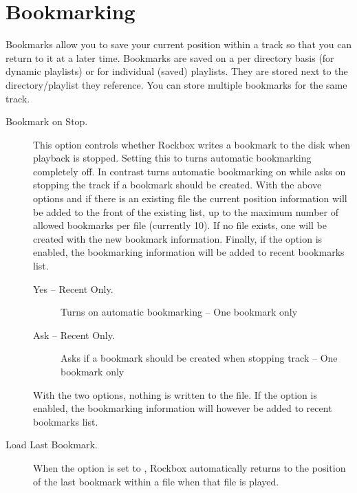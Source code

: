 \section{\label{ref:Bookmarkconfigactual}Bookmarking}
  Bookmarks allow you to save your current position within a track so that 
  you can return to it at a later time. Bookmarks are saved on a per directory
  basis (for dynamic playlists) or for individual (saved) playlists. They are 
  stored next to the directory/playlist they reference.
  You can store multiple bookmarks for the same track.
  \begin{description}
  \item [Bookmark on Stop. ]This option controls whether Rockbox writes a
    bookmark to the disk when playback is stopped. Setting this to
     turns automatic bookmarking completely off. In contrast
     turns automatic bookmarking on while  
    asks on stopping the track if a bookmark should be created.
    With the above options  and  if there is an existing 
     file the current position information will be added to the
    front of the existing list, up to the maximum number of allowed bookmarks
    per file (currently 10). If no  file exists, one will be
    created with the new bookmark information. Finally, if the 
     option is enabled, the bookmarking
    information will be added to recent bookmarks list.
    \begin{description}    
      \item[Yes -- Recent Only.]
            Turns on automatic bookmarking -- One bookmark only
      \item[Ask -- Recent Only.]
            Asks if a bookmark should be created when stopping track -- 
            One bookmark only
    \end{description}
    With the two  options, nothing is written to the 
     file. If the 
    option is enabled, the bookmarking information will however be added to
    recent bookmarks list. 
    
  \item [Load Last Bookmark. ]

  When the  option is set to , Rockbox
  automatically returns to the position of the last bookmark within a file
  when that file is played. 


\end{description}
